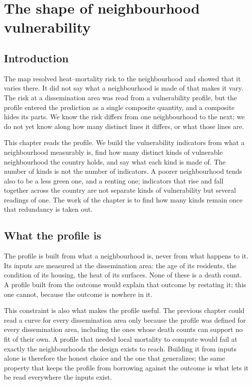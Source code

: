 \chapter{The shape of neighbourhood vulnerability}\label{chapter:vulnerability}

\section{Introduction}

The map resolved heat--mortality risk to the neighbourhood and showed that it varies there. It did not say what a neighbourhood is made of that makes it vary. The risk at a dissemination area was read from a vulnerability profile, but the profile entered the prediction as a single composite quantity, and a composite hides its parts. We know the risk differs from one neighbourhood to the next; we do not yet know along how many distinct lines it differs, or what those lines are.

This chapter reads the profile. We build the vulnerability indicators from what a neighbourhood measurably is, find how many distinct kinds of vulnerable neighbourhood the country holds, and say what each kind is made of. The number of kinds is not the number of indicators. A poorer neighbourhood tends also to be a less green one, and a renting one; indicators that rise and fall together across the country are not separate kinds of vulnerability but several readings of one. The work of the chapter is to find how many kinds remain once that redundancy is taken out.

\section{What the profile is}

The profile is built from what a neighbourhood is, never from what happens to it. Its inputs are measured at the dissemination area: the age of its residents, the condition of its housing, the heat of its surfaces. None of these is a death count. A profile built from the outcome would explain that outcome by restating it; this one cannot, because the outcome is nowhere in it.

This constraint is also what makes the profile useful. The previous chapter could read a curve for every dissemination area only because the profile was defined for every dissemination area, including the ones whose death counts can support no fit of their own. A profile that needed local mortality to compute would fail at exactly the neighbourhoods the design exists to reach. Building it from inputs alone is therefore the honest choice and the one that generalizes; the same property that keeps the profile from borrowing against the outcome is what lets it be read everywhere the inputs exist.

